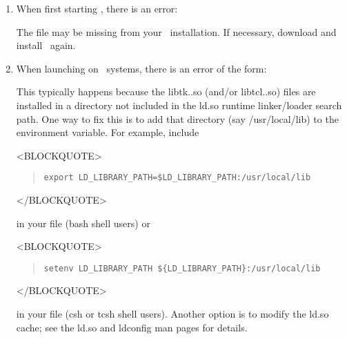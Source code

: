 \begin{enumerate}
\item When first starting , there is an error:
\begin{quote}
\raggedright
{}
\end{quote}

The file  may be missing from your 
\OOMMF\ installation.  If necessary, download and install \OOMMF\ again.

\item When launching  on \Unix\ systems, there is an error
of the form: 
\begin{quote}
\raggedright
{}
\end{quote}

This typically happens because the libtk\lb.\lb.so (and/or
libtcl\lb.\lb.so) files are installed in a directory not included in the
ld.so runtime linker/loader search path. One way to fix this is to add
that directory (say /usr/local/lib) to the 
environment variable. For example, include
\begin{rawhtml}
<BLOCKQUOTE>
\end{rawhtml}
\begin{quote}
\begin{verbatim}
export LD_LIBRARY_PATH=$LD_LIBRARY_PATH:/usr/local/lib 
\end{verbatim}
\end{quote}
\begin{rawhtml}
</BLOCKQUOTE>
\end{rawhtml}
in your  file (bash shell users) or
\begin{rawhtml}
<BLOCKQUOTE>
\end{rawhtml}
\begin{quote}
\begin{verbatim}
setenv LD_LIBRARY_PATH ${LD_LIBRARY_PATH}:/usr/local/lib 
\end{verbatim}
\end{quote}
\begin{rawhtml}
</BLOCKQUOTE>
\end{rawhtml}
in your  file (csh or tcsh shell users).  Another option
is to modify the ld.so cache; see the ld.so and ldconfig man pages for
details.


\end{enumerate}
